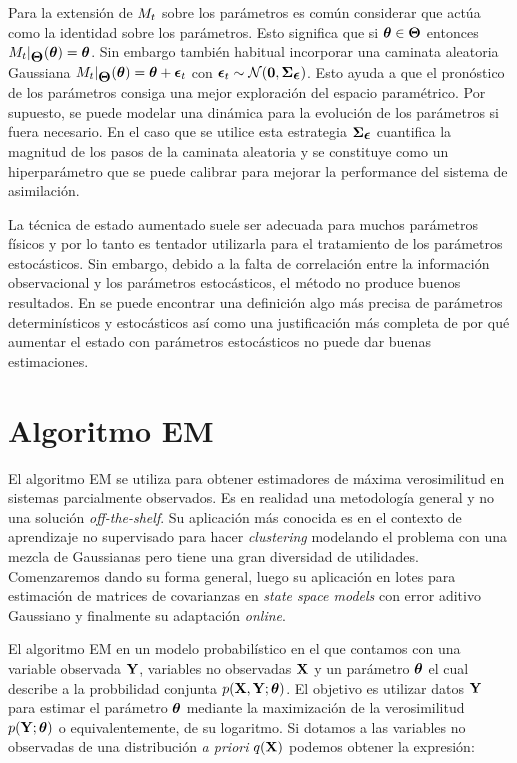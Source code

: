 Para la extensión de $\mathbf{\mathcal}{M}_t$ sobre los parámetros es común considerar que actúa como la identidad sobre los parámetros. Esto significa que si $\mbox{\boldmath$ \theta $} \in \mbox{\boldmath$ \Theta $}$ entonces $\mathbf{\mathcal}{M}_t |_{\mbox{\boldmath$ \Theta $}} (\mbox{\boldmath$ \theta $}) = \mbox{\boldmath$ \theta $}$. Sin embargo también habitual incorporar una caminata aleatoria Gaussiana $\mathbf{\mathcal}{M}_t |_{\mbox{\boldmath$ \Theta $}} (\mbox{\boldmath$ \theta $}) = \mbox{\boldmath$ \theta $} + \mbox{\boldmath$ \epsilon $}_t$ con $\mbox{\boldmath$ \epsilon $}_t \sim \mathcal{N}(\mathbf{0}, \mbox{\boldmath$ \Sigma $}_{\mbox{\boldmath$ \epsilon $}})$. Esto ayuda a que el pronóstico de los parámetros consiga una mejor exploración del espacio paramétrico. Por supuesto, se puede modelar una dinámica para la evolución de los parámetros si fuera necesario. En el caso que se utilice esta estrategia $\mbox{\boldmath$ \Sigma $}_{\mbox{\boldmath$ \epsilon $}}$ cuantifica la magnitud de los pasos de la caminata aleatoria y se constituye como un hiperparámetro que se puede calibrar para mejorar la performance del sistema de asimilación. 

La técnica de estado aumentado suele ser adecuada para muchos parámetros físicos y por lo tanto es tentador utilizarla para el tratamiento de los parámetros estocásticos. Sin embargo, debido a la falta de correlación entre la información observacional y los parámetros estocásticos, el método no produce buenos resultados. En \cite{Delsole2010} se puede encontrar una definición algo más precisa de parámetros determinísticos y estocásticos así como una justificación más completa de por qué aumentar el estado con parámetros estocásticos no puede dar buenas estimaciones.

\section{Algoritmo EM}

El algoritmo EM se utiliza para obtener estimadores de máxima verosimilitud en sistemas parcialmente observados. Es en realidad una metodología general y no una solución \textit{off-the-shelf}. Su aplicación más conocida es en el contexto de aprendizaje no supervisado para hacer \textit{clustering} modelando el problema con una mezcla de Gaussianas \citep{Bishop2006} pero tiene una gran diversidad de utilidades. Comenzaremos dando su forma general, luego su aplicación en lotes para estimación de matrices de covarianzas en \textit{state space models} con error aditivo Gaussiano y finalmente su adaptación \textit{online}.

El algoritmo EM en un modelo probabilístico en el que contamos con una variable observada $\mathbf{Y}$, variables no observadas $\mathbf{X}$ y un parámetro $\mbox{\boldmath$ \theta $}$ el cual describe a la probbilidad conjunta $p(\mathbf{X},  \mathbf{Y}; \mbox{\boldmath$ \theta $})$. El objetivo es utilizar datos $\mathbf{Y}$ para estimar el parámetro $\mbox{\boldmath$ \theta $}$ mediante la maximización de la verosimilitud $p(\mathbf{Y}; \mbox{\boldmath$ \theta $})$ o equivalentemente, de su logaritmo. Si dotamos a las variables no observadas de una distribución \textit{a priori} $q(\mathbf{X})$ podemos obtener la expresión:

